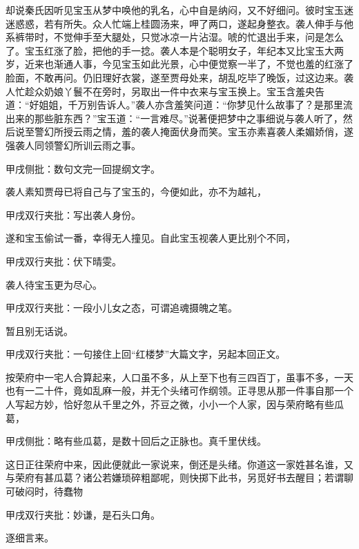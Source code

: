 \begin{parag}
    却说秦氏因听见宝玉从梦中唤他的乳名，心中自是纳闷，又不好细问。彼时宝玉迷迷惑惑，若有所失。众人忙端上桂圆汤来，呷了两口，遂起身整衣。袭人伸手与他系裤带时，不觉伸手至大腿处，只觉冰凉一片沾湿。唬的忙退出手来，问是怎么了。宝玉红涨了脸，把他的手一捻。袭人本是个聪明女子，年纪本又比宝玉大两岁，近来也渐通人事，今见宝玉如此光景，心中便觉察一半了，不觉也羞的红涨了脸面，不敢再问。仍旧理好衣裳，遂至贾母处来，胡乱吃毕了晚饭，过这边来。袭人忙趁众奶娘丫鬟不在旁时，另取出一件中衣来与宝玉换上。宝玉含羞央告道：“好姐姐，千万别告诉人。”袭人亦含羞笑问道：“你梦见什么故事了？是那里流出来的那些脏东西？”宝玉道：“一言难尽。”说著便把梦中之事细说与袭人听了，然后说至警幻所授云雨之情，羞的袭人掩面伏身而笑。宝玉亦素喜袭人柔媚娇俏，遂强袭人同领警幻所训云雨之事。\begin{note}甲戌侧批：数句文完一回提纲文字。\end{note}袭人素知贾母已将自己与了宝玉的，今便如此，亦不为越礼，\begin{note}甲戌双行夹批：写出袭人身份。\end{note}遂和宝玉偷试一番，幸得无人撞见。自此宝玉视袭人更比别个不同，\begin{note}甲戌双行夹批：伏下晴雯。\end{note}袭人待宝玉更为尽心。\begin{note}甲戌双行夹批：一段小儿女之态，可谓追魂摄魄之笔。\end{note}暂且别无话说。\begin{note}甲戌双行夹批：一句接住上回“红楼梦”大篇文字，另起本回正文。\end{note}
\end{parag}


\begin{parag}
    按荣府中一宅人合算起来，人口虽不多，从上至下也有三四百丁，虽事不多，一天也有一二十件，竟如乱麻一般，并无个头绪可作纲领。正寻思从那一件事自那一个人写起方妙，恰好忽从千里之外，芥豆之微，小小一个人家，因与荣府略有些瓜葛，\begin{note}甲戌侧批：略有些瓜葛，是数十回后之正脉也。真千里伏线。 \end{note}这日正往荣府中来，因此便就此一家说来，倒还是头绪。你道这一家姓甚名谁，又与荣府有甚瓜葛？诸公若嫌琐碎粗鄙呢，则快掷下此书，另觅好书去醒目；若谓聊可破闷时，待蠢物\begin{note}甲戌双行夹批：妙谦，是石头口角。\end{note}逐细言来。
\end{parag}


